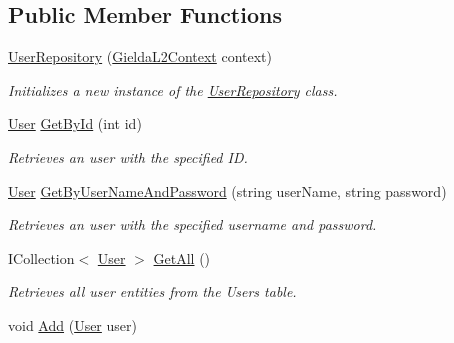 \subsection*{Public Member Functions}
\begin{DoxyCompactItemize}
\item 
\mbox{\hyperlink{class_gielda_l2_1_1_i_n_f_r_a_s_t_r_u_c_t_u_r_e_1_1_repositories_1_1_user_repository_ab90832b2de2f213d9cd05aee989a0a13}{User\+Repository}} (\mbox{\hyperlink{class_gielda_l2_1_1_d_b_1_1_gielda_l2_context}{Gielda\+L2\+Context}} context)
\begin{DoxyCompactList}\small\item\em Initializes a new instance of the \mbox{\hyperlink{class_gielda_l2_1_1_i_n_f_r_a_s_t_r_u_c_t_u_r_e_1_1_repositories_1_1_user_repository}{User\+Repository}} class. \end{DoxyCompactList}\item 
\mbox{\hyperlink{class_gielda_l2_1_1_d_b_1_1_entities_1_1_user}{User}} \mbox{\hyperlink{class_gielda_l2_1_1_i_n_f_r_a_s_t_r_u_c_t_u_r_e_1_1_repositories_1_1_user_repository_a59783783c8210efff03a749d4f63fadf}{Get\+By\+Id}} (int id)
\begin{DoxyCompactList}\small\item\em Retrieves an user with the specified ID. \end{DoxyCompactList}\item 
\mbox{\hyperlink{class_gielda_l2_1_1_d_b_1_1_entities_1_1_user}{User}} \mbox{\hyperlink{class_gielda_l2_1_1_i_n_f_r_a_s_t_r_u_c_t_u_r_e_1_1_repositories_1_1_user_repository_a6ddb02c156ab0944804a41a5a9531482}{Get\+By\+User\+Name\+And\+Password}} (string user\+Name, string password)
\begin{DoxyCompactList}\small\item\em Retrieves an user with the specified username and password. \end{DoxyCompactList}\item 
I\+Collection$<$ \mbox{\hyperlink{class_gielda_l2_1_1_d_b_1_1_entities_1_1_user}{User}} $>$ \mbox{\hyperlink{class_gielda_l2_1_1_i_n_f_r_a_s_t_r_u_c_t_u_r_e_1_1_repositories_1_1_user_repository_ab9a56b5b0dfe9cf6350eebcf751adcfc}{Get\+All}} ()
\begin{DoxyCompactList}\small\item\em Retrieves all user entities from the Users table. \end{DoxyCompactList}\item 
void \mbox{\hyperlink{class_gielda_l2_1_1_i_n_f_r_a_s_t_r_u_c_t_u_r_e_1_1_repositories_1_1_user_repository_a686490e4e59fb25b843d11bab137ec56}{Add}} (\mbox{\hyperlink{class_gielda_l2_1_1_d_b_1_1_entities_1_1_user}{User}} user)

\end{DoxyCompactItemize}
